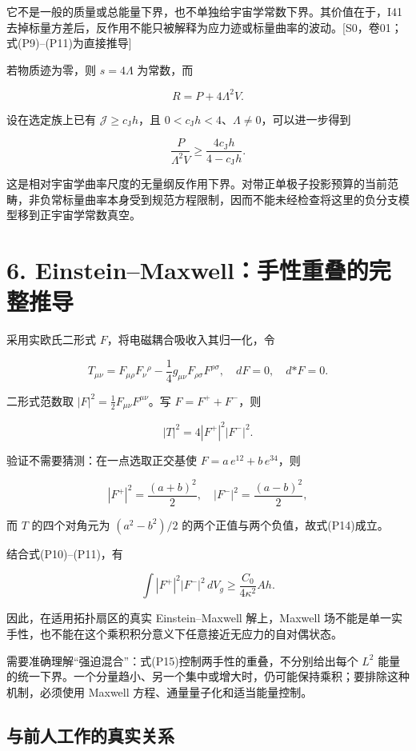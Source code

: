 \documentclass[UTF8,a4paper,11pt,fontset=fandol]{ctexart}
\begin{document}
它不是一般的质量或总能量下界，也不单独给宇宙学常数下界。其价值在于，I41
去掉标量方差后，反作用不能只被解释为应力迹或标量曲率的波动。{[}S0，卷01；式(P9)--(P11)为直接推导{]}

若物质迹为零，则 \(s=4\Lambda\) 为常数，而

\[
R=P+4\Lambda^2V.
\]

设在选定族上已有 \(\mathcal J\ge c_{\mathrm J}h\)，且
\(0<c_{\mathrm J}h<4\)、\(\Lambda\ne0\)，可以进一步得到

\[
\boxed{
\frac{P}{\Lambda^2V}
\ge\frac{4c_{\mathrm J}h}{4-c_{\mathrm J}h}.
}
\tag{P12}
\]

这是相对宇宙学曲率尺度的无量纲反作用下界。对带正单极子投影预算的当前范畴，非负常标量曲率本身受到规范方程限制，因而不能未经检查将这里的负分支模型移到正宇宙学常数真空。

\section{6.
Einstein--Maxwell：手性重叠的完整推导}\label{einsteinmaxwellux624bux6027ux91cdux53e0ux7684ux5b8cux6574ux63a8ux5bfc}

采用实欧氏二形式 \(F\)，将电磁耦合吸收入其归一化，令

\[
T_{\mu\nu}=F_{\mu\rho}F_\nu{}^\rho
-\frac14g_{\mu\nu}F_{\rho\sigma}F^{\rho\sigma},
\quad dF=0,\quad d{*F}=0.
\tag{P13}
\]

二形式范数取 \(|F|^2=\tfrac12F_{\mu\nu}F^{\mu\nu}\)。写
\(F=F^++F^-\)，则

\[
\boxed{|T|^2=4|F^+|^2|F^-|^2.}
\tag{P14}
\]

验证不需要猜测：在一点选取正交基使 \(F=a\,e^{12}+b\,e^{34}\)，则

\[
|F^+|^2=\frac{(a+b)^2}{2},\quad
|F^-|^2=\frac{(a-b)^2}{2},
\]

而 \(T\) 的四个对角元为 \((a^2-b^2)/2\)
的两个正值与两个负值，故式(P14)成立。

结合式(P10)--(P11)，有

\[
\boxed{
\int|F^+|^2|F^-|^2\,dV_g
\ge\frac{C_0}{4\kappa^2}Ah.
}
\tag{P15}
\]

因此，在适用拓扑扇区的真实 Einstein--Maxwell 解上，Maxwell
场不能是单一实手性，也不能在这个乘积积分意义下任意接近无应力的自对偶状态。

需要准确理解``强迫混合''：式(P15)控制两手性的重叠，不分别给出每个
\(L^2\)
能量的统一下界。一个分量趋小、另一个集中或增大时，仍可能保持乘积；要排除这种机制，必须使用
Maxwell 方程、通量量子化和适当能量控制。

\subsection{与前人工作的真实关系}\label{ux4e0eux524dux4ebaux5de5ux4f5cux7684ux771fux5b9eux5173ux7cfb}
\end{document}
